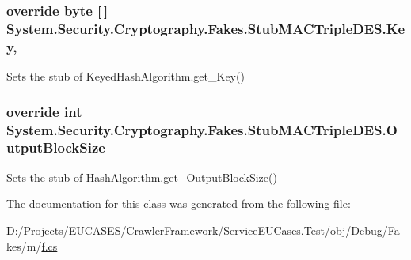 \hypertarget{class_system_1_1_security_1_1_cryptography_1_1_fakes_1_1_stub_m_a_c_triple_d_e_s_a0f32d056a5ea106b731bbda67b5f2885}{
\subsubsection[{Key}]{\setlength{\rightskip}{0pt plus 5cm}override byte \mbox{[}$\,$\mbox{]} System.\-Security.\-Cryptography.\-Fakes.\-Stub\-M\-A\-C\-Triple\-D\-E\-S.\-Key\hspace{0.3cm}{\ttfamily [get]}, {\ttfamily [set]}}}\label{class_system_1_1_security_1_1_cryptography_1_1_fakes_1_1_stub_m_a_c_triple_d_e_s_a0f32d056a5ea106b731bbda67b5f2885}


Sets the stub of Keyed\-Hash\-Algorithm.\-get\-\_\-\-Key()

\hypertarget{class_system_1_1_security_1_1_cryptography_1_1_fakes_1_1_stub_m_a_c_triple_d_e_s_a31026d2b786e2d5581b7a845dcaa36cc}{
\subsubsection[{Output\-Block\-Size}]{\setlength{\rightskip}{0pt plus 5cm}override int System.\-Security.\-Cryptography.\-Fakes.\-Stub\-M\-A\-C\-Triple\-D\-E\-S.\-Output\-Block\-Size\hspace{0.3cm}{\ttfamily [get]}}}\label{class_system_1_1_security_1_1_cryptography_1_1_fakes_1_1_stub_m_a_c_triple_d_e_s_a31026d2b786e2d5581b7a845dcaa36cc}


Sets the stub of Hash\-Algorithm.\-get\-\_\-\-Output\-Block\-Size()



The documentation for this class was generated from the following file\-:\begin{DoxyCompactItemize}
\item 
D\-:/\-Projects/\-E\-U\-C\-A\-S\-E\-S/\-Crawler\-Framework/\-Service\-E\-U\-Cases.\-Test/obj/\-Debug/\-Fakes/m/\hyperlink{m_2f_8cs}{f.\-cs}\end{DoxyCompactItemize}
